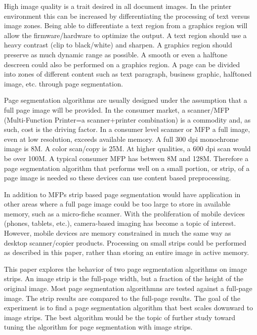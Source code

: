 \documentclass[conference]{IEEEtran}
\begin{document}
High image quality is a trait desired in all document images.
In the printer environment this can be increased by differentiating the processing of text versus image zones.
Being able to differentiate a text region from a graphics region
will allow the firmware/hardware to optimize the output. A text region should
use a heavy contrast (clip to black/white) and sharpen. A graphics region
should preserve as much dynamic range as possible. A smooth or even a halftone
descreen could also be performed on a graphics region.
A page can be divided into
zones of different content such as text paragraph, business graphic, halftoned
image, etc. through page segmentation.

Page segmentation algorithms are usually designed under the assumption that a full page image will be provided.
In the consumer market, a scanner/MFP (Multi-Function Printer=a scanner+printer combination) is a commodity and, as such, cost is the driving factor. 
In a consumer level scanner or MFP a full image, even at low resolution, exceeds available memory. 
A full 300 dpi monochrome image is 8M. A color scan/copy is
25M. At higher qualities, a 600 dpi scan would be over 100M. A typical consumer
MFP has between 8M and 128M. 
Therefore a page segmentation algorithm that performs well on a small portion, or strip, of a page image is needed so these devices can use content based preprocessing.

In addition to MFPs
strip based page segmentation would have application 
in other areas where a full page image could be too large to
store in available memory, such as a micro-fiche scanner. 
With the proliferation of mobile devices (phones, tablets, etc.), camera-based
imaging has become a topic of interest.  However, mobile devices are memory
constrained in much the same way as desktop scanner/copier products. 
Processing on small strips could be performed as described in this paper,
rather than storing an entire image in active memory.

This paper explores the behavior of two page segmentation algorithms on image strips.
An image strip is the full-page width, but a fraction of the height of the original image.
Most page segmentation algorithmns are tested against a full-page image. 
The strip results are compared to the full-page results. The goal of the
experiment is to find a page segmentation algorithm that best scales downward
to image strips. The best algorithm would be the topic of further study toward
tuning the algorithm for page segmentation with image strips.
\end{document}
